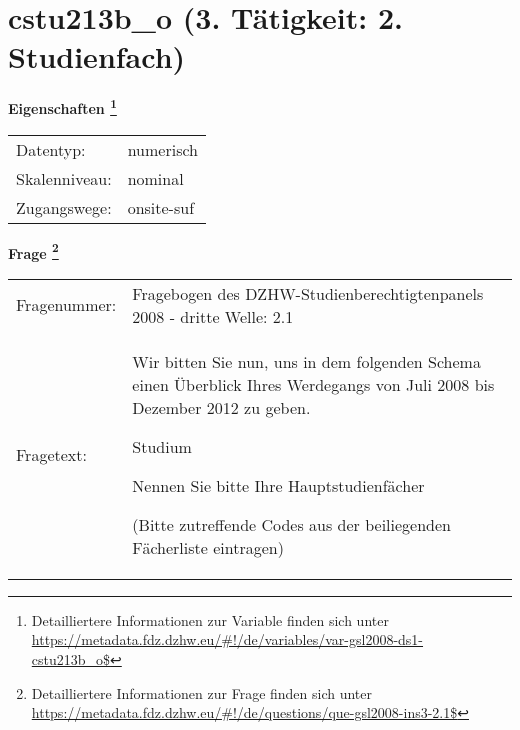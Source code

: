 
    \setcounter{footnote}{0}

    \vspace*{-1.8cm}
	\section{cstu213b\_o (3. Tätigkeit: 2. Studienfach)}
	\label{section:cstu213b_o}



    \vspace*{0.5cm}
    \noindent\textbf{Eigenschaften
	\footnote{Detailliertere Informationen zur Variable finden sich unter
		\url{https://metadata.fdz.dzhw.eu/\#!/de/variables/var-gsl2008-ds1-cstu213b_o$}}}\\
	\begin{tabularx}{\hsize}{@{}lX}
	Datentyp: & numerisch \\
	Skalenniveau: & nominal \\
	Zugangswege: &
	  onsite-suf
 \\
    \end{tabularx}



				\vspace*{0.5cm}
                \noindent\textbf{Frage
	                \footnote{Detailliertere Informationen zur Frage finden sich unter
		              \url{https://metadata.fdz.dzhw.eu/\#!/de/questions/que-gsl2008-ins3-2.1$}}}\\
				\begin{tabularx}{\hsize}{@{}lX}
					Fragenummer: &
					  Fragebogen des DZHW-Studienberechtigtenpanels 2008 - dritte Welle:
					  2.1
 \\
					Fragetext: & Wir bitten Sie nun, uns in dem folgenden Schema einen Überblick Ihres Werdegangs von Juli 2008 bis Dezember 2012 zu geben.\par  Studium\par  Nennen Sie bitte Ihre Hauptstudienfächer\par  (Bitte zutreffende Codes aus der beiliegenden Fächerliste eintragen) \\
				\end{tabularx}





